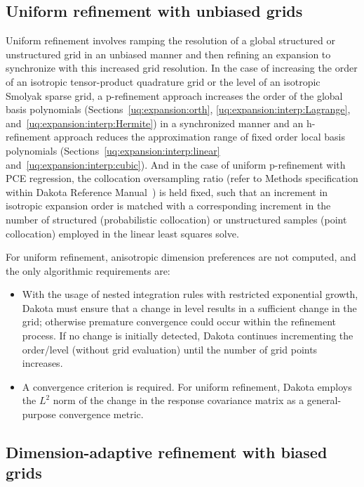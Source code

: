 \subsection{Uniform refinement with unbiased grids}
\label{uq:expansion:refine:uniform}

Uniform refinement involves ramping the resolution of a global
structured or unstructured grid in an unbiased manner and then
refining an expansion to synchronize with this increased grid
resolution.  In the case of increasing the order of an isotropic
tensor-product quadrature grid or the level of an isotropic Smolyak
sparse grid, a p-refinement approach increases the order of the global
basis polynomials (Sections~\ref{uq:expansion:orth},
\ref{uq:expansion:interp:Lagrange},
and~\ref{uq:expansion:interp:Hermite}) in a synchronized manner and an
h-refinement approach reduces the approximation range of fixed order
local basis polynomials (Sections~\ref{uq:expansion:interp:linear}
and~\ref{uq:expansion:interp:cubic}).  And in the case of uniform
p-refinement with PCE regression, the collocation oversampling ratio
(refer to Methods specification within Dakota Reference
Manual~\cite{RefMan}) is held fixed, such that an increment in
isotropic expansion order is matched with a corresponding increment in
the number of structured (probabilistic collocation) or unstructured
samples (point collocation) employed in the linear least squares solve.
 
For uniform refinement, anisotropic dimension preferences are not
computed, and the only algorithmic requirements are:
\begin{itemize}
\item With the usage of nested integration rules with restricted
  exponential growth, Dakota must ensure that a change in level
  results in a sufficient change in the grid; otherwise premature
  convergence could occur within the refinement process.  If no change
  is initially detected, Dakota continues incrementing the order/level
  (without grid evaluation) until the number of grid points increases.
\item A convergence criterion is required.  For uniform refinement,
  Dakota employs the $L^2$ norm of the change in the response
  covariance matrix as a general-purpose convergence metric.
\end{itemize}


\subsection{Dimension-adaptive refinement with biased grids}

